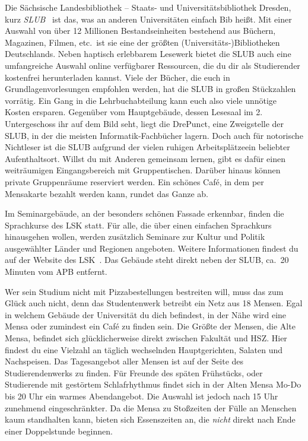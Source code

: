 Die Sächsische Landesbibliothek – Staats- und Universitätsbibliothek Dresden, kurz \emph{SLUB}~ ist das, was an anderen Universitäten einfach Bib heißt.
Mit einer Auswahl von über 12 Millionen Bestandseinheiten bestehend aus Büchern, Magazinen, Filmen, etc.\ ist sie eine der größten (Universitäts-)Bibliotheken Deutschlands.
Neben haptisch erlebbarem Lesewerk bietet die SLUB auch eine umfangreiche Auswahl online verfügbarer Ressourcen, die du dir als Studierender kostenfrei herunterladen kannst.
Viele der Bücher, die euch in Grundlagenvorlesungen empfohlen werden, hat die SLUB in großen Stückzahlen vorrätig. Ein Gang in die Lehrbuchabteilung kann euch also viele unnötige Kosten ersparen.
Gegenüber vom Hauptgebäude, dessen Lesesaal im 2. Untergeschoss ihr auf dem Bild seht, liegt die DrePunct, eine Zweigstelle der SLUB, in der die meisten Informatik-Fachbücher lagern.
Doch auch für notorische Nichtleser ist die SLUB aufgrund der vielen ruhigen Arbeitsplätzeein beliebter Aufenthaltsort.
Willst du mit Anderen gemeinsam lernen, gibt es dafür einen weiträumigen Eingangsbereich mit Gruppentischen.
Darüber hinaus können private Gruppenräume reserviert werden. Ein schönes Café, in dem per Mensakarte bezahlt werden kann, rundet das Ganze ab.

Im Seminargebäude, an der besonders schönen Fassade erkennbar, finden die Sprachkurse des LSK statt.
Für alle, die über einen einfachen Sprachkurs hinausgehen wollen, werden zusätzlich Seminare zur Kultur und Politik ausgewählter Länder und Regionen angeboten.
Weitere Informationen findest du auf der Website des LSK~.
Das Gebäude steht direkt neben der SLUB, ca.\ 20 Minuten vom APB entfernt.

Wer sein Studium nicht mit Pizzabestellungen bestreiten will, muss das zum Glück auch nicht, denn das Studentenwerk betreibt ein Netz aus 18 Mensen.
Egal in welchem Gebäude der Universität du dich befindest, in der Nähe wird eine Mensa oder zumindest ein Café zu finden sein.
Die Größte der Mensen, die Alte Mensa, befindet sich glücklicherweise direkt zwischen Fakultät und HSZ\@.
Hier findest du eine Vielzahl an täglich wechselnden Hauptgerichten, Salaten und Nachspeisen.
Das Tagesangebot aller Mensen ist auf der Seite des Studierendenwerks  zu finden.
Für Freunde des späten Frühstücks, oder Studierende mit gestörtem Schlafrhythmus findet sich in der Alten Mensa Mo-Do bis 20 Uhr ein warmes Abendangebot.
Die Auswahl ist jedoch nach 15 Uhr zunehmend eingeschränkter.
Da die Mensa zu Stoßzeiten der Fülle an Menschen kaum standhalten kann, bieten sich Essenszeiten an, die \emph{nicht} direkt nach Ende einer Doppelstunde beginnen.

